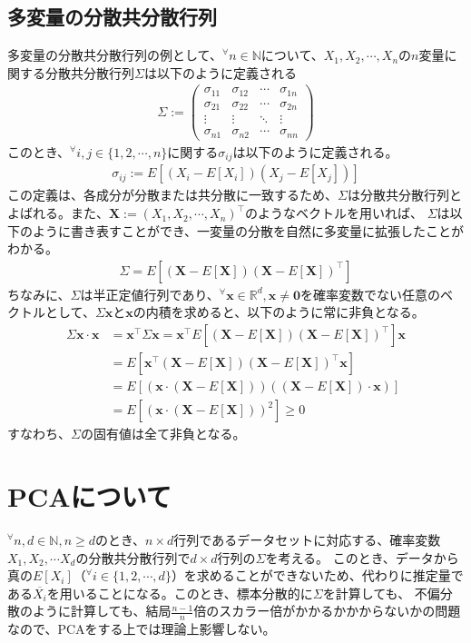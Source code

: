 \documentclass[10pt]{ujarticle}
\begin{document}
\subsection{多変量の分散共分散行列}
多変量の分散共分散行列の例として、$^\forall n\in\mathbb{N}$について、$X_1,X_2,\cdots,X_n$の$n$変量に関する分散共分散行列$\Sigma$は以下のように定義される
$$
\begin{aligned}
  \Sigma:=\begin{pmatrix}\sigma_{11}&\sigma_{12}&\cdots&\sigma_{1n}\\\sigma_{21}&\sigma_{22}&\cdots&\sigma_{2n}\\\vdots&\vdots&\ddots&\vdots\\\sigma_{n1}&\sigma_{n2}&\cdots&\sigma_{nn}\end{pmatrix}
\end{aligned}
$$
このとき、$^\forall i,j\in\{1,2,\cdots,n\}$に関する$\sigma_{ij}$は以下のように定義される。
$$
\begin{aligned}
  \sigma_{ij}:=E[(X_i-E[X_i])(X_j-E[X_j])]
\end{aligned}
$$
この定義は、各成分が分散または共分散に一致するため、$\Sigma$は分散共分散行列とよばれる。また、$\mathbf{X}:=(X_1,X_2,\cdots,X_n)^\top$のようなベクトルを用いれば、
$\Sigma$は以下のように書き表すことができ、一変量の分散を自然に多変量に拡張したことがわかる。
$$
\begin{aligned}
  \Sigma=E[(\mathbf{X}-E[\mathbf{X}])(\mathbf{X}-E[\mathbf{X}])^\top]
\end{aligned}
$$
ちなみに、$\Sigma$は半正定値行列であり、$^\forall \mathbf{x}\in\mathbb{R}^d,\mathbf{x}\neq\mathbf{0}$を確率変数でない任意のベクトルとして、$\Sigma\mathbf{x}$と$\mathbf{x}$の内積を求めると、以下のように常に非負となる。
$$
\begin{aligned}
  \Sigma\mathbf{x}\cdot\mathbf{x}&=\mathbf{x}^\top\Sigma\mathbf{x}=\mathbf{x}^\top E[(\mathbf{X}-E[\mathbf{X}])(\mathbf{X}-E[\mathbf{X}])^\top]\mathbf{x}\\
  &=E[\mathbf{x}^\top (\mathbf{X}-E[\mathbf{X}])(\mathbf{X}-E[\mathbf{X}])^\top \mathbf{x}]\\
  &=E[(\mathbf{x}\cdot(\mathbf{X}-E[\mathbf{X}]))((\mathbf{X}-E[\mathbf{X}])\cdot\mathbf{x})]\\
  &=E[(\mathbf{x}\cdot(\mathbf{X}-E[\mathbf{X}]))^2]\geq 0
\end{aligned}
$$
すなわち、$\Sigma$の固有値は全て非負となる。

\section{PCAについて}
$^\forall n,d\in\mathbb{N},n\geq d$のとき、$n\times d$行列であるデータセットに対応する、確率変数$X_1,X_2,\cdots X_d$の分散共分散行列で$d\times d$行列の$\Sigma$を考える。
このとき、データから真の$E[X_i]$（$^\forall i\in\{1,2,\cdots, d\}$）を求めることができないため、代わりに推定量である$\overline{X_i}$を用いることになる。このとき、標本分散的に$\Sigma$を計算しても、
不偏分散のように計算しても、結局$\frac{n-1}{n}$倍のスカラー倍がかかるかかからないかの問題なので、PCAをする上では理論上影響しない。
\end{document}
